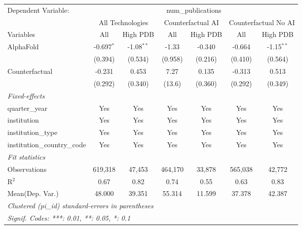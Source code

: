 \begingroup
\centering
\begin{tabular}{lcccccc}
   \tabularnewline \midrule \midrule
   Dependent Variable: & \multicolumn{6}{c}{num\_publications}\\
 & \multicolumn{2}{c}{All Technologies} & \multicolumn{2}{c}{Counterfactual AI} & \multicolumn{2}{c}{Counterfactual No AI} \\
\cmidrule(lr){1-1}\cmidrule(lr){2-3} \cmidrule(lr){4-5} \cmidrule(lr){6-7}
Variables & \multicolumn{1}{c}{All} & \multicolumn{1}{c}{High PDB} & \multicolumn{1}{c}{All} & \multicolumn{1}{c}{High PDB} & \multicolumn{1}{c}{All} & \multicolumn{1}{c}{High PDB} \\
\cmidrule(lr){1-1}\cmidrule(lr){2-2} \cmidrule(lr){3-3} \cmidrule(lr){4-4} \cmidrule(lr){5-5} \cmidrule(lr){6-6} \cmidrule(lr){7-7}
   AlphaFold                    & -0.697$^{*}$ & -1.08$^{**}$ & -1.33   & -0.340  & -0.664  & -1.15$^{**}$\\   
                                & (0.394)      & (0.534)      & (0.958) & (0.216) & (0.410) & (0.564)\\   
   Counterfactual               & -0.231       & 0.453        & 7.27    & 0.135   & -0.313  & 0.513\\   
                                & (0.292)      & (0.340)      & (13.6)  & (0.360) & (0.292) & (0.349)\\   
   \midrule
   \emph{Fixed-effects}\\
   quarter\_year                & Yes          & Yes          & Yes     & Yes     & Yes     & Yes\\  
   institution                  & Yes          & Yes          & Yes     & Yes     & Yes     & Yes\\  
   institution\_type            & Yes          & Yes          & Yes     & Yes     & Yes     & Yes\\  
   institution\_country\_code   & Yes          & Yes          & Yes     & Yes     & Yes     & Yes\\  
   \midrule
   \emph{Fit statistics}\\
   Observations                 & 619,318      & 47,453       & 464,170 & 33,878  & 565,038 & 42,772\\  
   R$^2$                        & 0.67         & 0.82         & 0.74    & 0.55    & 0.63    & 0.83\\  
Mean(Dep. Var.) & 48.000 & 39.351 & 55.314 & 11.599 & 37.378 & 42.387 \\
   \midrule \midrule
   \multicolumn{7}{l}{\emph{Clustered (pi\_id) standard-errors in parentheses}}\\
   \multicolumn{7}{l}{\emph{Signif. Codes: ***: 0.01, **: 0.05, *: 0.1}}\\
\end{tabular}
\par\endgroup
